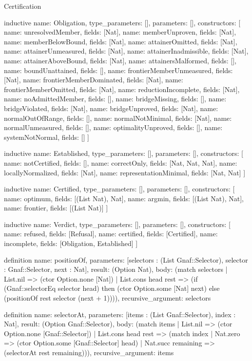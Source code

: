 \begin{lexlean}{Certification}
\begin{semanticmodule}
inductive{
  name: Obligation,
  type_parameters: [],
  parameters: [],
  constructors: [
    {name: unresolvedMember, fields: [Nat]},
    {name: memberUnproven, fields: [Nat]},
    {name: memberBelowBound, fields: [Nat]},
    {name: attainerOmitted, fields: [Nat]},
    {name: attainerUnmeasured, fields: [Nat]},
    {name: attainerInadmissible, fields: [Nat]},
    {name: attainerAboveBound, fields: [Nat]},
    {name: attainersMalformed, fields: []},
    {name: boundUnattained, fields: []},
    {name: frontierMemberUnmeasured, fields: [Nat]},
    {name: frontierMemberDominated, fields: [Nat]},
    {name: frontierMemberOmitted, fields: [Nat]},
    {name: reductionIncomplete, fields: [Nat]},
    {name: noAdmittedMember, fields: []},
    {name: bridgeMissing, fields: []},
    {name: bridgeViolated, fields: [Nat]},
    {name: bridgeUnproved, fields: [Nat]},
    {name: normalOutOfRange, fields: []},
    {name: normalNotMinimal, fields: [Nat]},
    {name: normalUnmeasured, fields: []},
    {name: optimalityUnproved, fields: []},
    {name: systemNotNormal, fields: []}
  ]
}

inductive{
  name: Established,
  type_parameters: [],
  parameters: [],
  constructors: [
    {name: notCertified, fields: []},
    {name: correctOnly, fields: [Nat, Nat, Nat]},
    {name: locallyNormalized, fields: [Nat]},
    {name: representationMinimal, fields: [Nat, Nat]}
  ]
}

inductive{
  name: Certified,
  type_parameters: [],
  parameters: [],
  constructors: [
    {name: optimum, fields: [(List Nat), Nat]},
    {name: argmin, fields: [(List Nat), Nat]},
    {name: frontier, fields: [(List Nat)]}
  ]
}

inductive{
  name: Verdict,
  type_parameters: [],
  parameters: [],
  constructors: [
    {name: refused, fields: [Refusal]},
    {name: certified, fields: [Certified]},
    {name: incomplete, fields: [Obligation, Established]}
  ]
}

definition{
  name: positionOf,
  parameters: [selectors : (List Gnaf::Selector), selector : Gnaf::Selector, next : Nat],
  result: (Option Nat),
  body: (match selectors
    | List.nil => (ctor Option.none [Nat])
    | List.cons head rest => (if (Gnaf::selectorEq selector head) then (ctor Option.some [Nat] next) else (positionOf rest selector (next + 1)))),
  recursive_argument: selectors
}

definition{
  name: selectorAt,
  parameters: [items : (List Gnaf::Selector), index : Nat],
  result: (Option Gnaf::Selector),
  body: (match items
    | List.nil => (ctor Option.none [Gnaf::Selector])
    | List.cons head rest => (match index
      | Nat.zero => (ctor Option.some [Gnaf::Selector] head)
      | Nat.succ remaining => (selectorAt rest remaining))),
  recursive_argument: items
}


\end{semanticmodule}
\end{lexlean}

